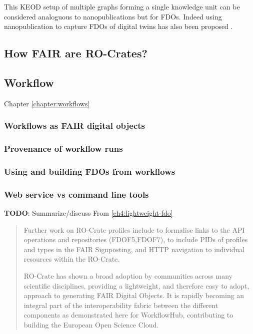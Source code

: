 This KEOD setup of multiple graphs forming a single knowledge unit can be considered analoguous to nanopublications \cite{Kuhn 2021} but for FDOs. Indeed using nanopublication to capture FDOs of digital twins has also been proposed  \cite{10.3389/data.2022.883341}.



\subsection{How FAIR are RO-Crates?}

\cite{FAIROs}


\subsection{Workflow}

Chapter \vref{chapter:workflows} 

\subsubsection{Workflows as FAIR digital objects}



\subsubsection{Provenance of workflow runs}

\cite{workflow-run-crate}


\subsubsection{Using and building FDOs from workflows}


\subsubsection{Web service vs command line tools}

\textbf{TODO}: Summarize/discuss 
From \vref{ch4:lightweight-fdo}

\begin{quotation} 
  Further work on RO-Crate profiles include to formalise links to the API
  operations and repositories (FDOF5,FDOF7), to include PIDs of
  profiles and types in the FAIR Signposting, and HTTP navigation to
  individual resources within the RO-Crate.

  RO-Crate has shown a broad adoption by communities across many
  scientific disciplines, providing a lightweight, and therefore easy to
  adopt, approach to generating FAIR Digital Objects.
  It is rapidly
  becoming an integral part of the interoperability fabric between the
  different components as demonstrated here for WorkflowHub, contributing
  to building the European Open Science Cloud.
\end{quotation}


